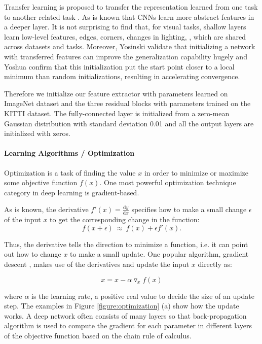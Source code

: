 Transfer learning is proposed to transfer the representation learned from one task to another related task \cite{Pan:2010:STL:1850483.1850545}. As is known that CNNs learn more abstract features in a deeper layer. It is not surprising to find that, for visual tasks, shallow layers learn low-level features, \eg edges, corners, changes in lighting, \etc, which are shared across datasets and tasks. Moreover, Yosinski \etal validate \cite{DBLP:journals/corr/YosinskiCBL14} that initializing a network with transferred features can improve the generalization capability hugely and Yoshua \etal \cite{NIPS2006_3048} confirm that this initialization put the start point closer to a local minimum than random initializations, resulting in accelerating convergence.

Therefore we initialize our feature extractor with parameters learned on ImageNet dataset \cite{DBLP:Russakovsky14} and the three residual blocks with parameters trained on the KITTI dataset. The fully-connected layer is initialized from a zero-mean Gaussian distribution with standard deviation 0.01 and all the output layers are initialized with zeros.


\paragraph{Learning Algorithms / Optimization}

Optimization is a task of finding the value $x$ in order to minimize or maximize some objective function $f(x)$. One most powerful optimization technique category in deep learning is gradient-based.

As is known, the derivative $f'(x)=\frac{\text{d}y}{\text{d}x}$ specifies how to make a small change $\epsilon$ of the input $x$ to get the corresponding change in the function:
\begin{equation}
	f(x + \epsilon)~ \approx ~ f(x) + \epsilon f'(x).
\end{equation}

Thus, the derivative tells the direction to minimize a function, i.e. it can point out how to change $x$ to make a small update. One popular algorithm, gradient descent \cite{gd1847}, makes use of the derivatives and update the input $x$ directly as:

\begin{equation}
x = x - \alpha {\triangledown} _x f(x)
\end{equation}

where $\alpha$ is the learning rate, a positive real value to decide the size of an update step. The examples in Figure \ref{figure:optimization} (a) show how the update works.  A deep network often consists of many layers so that back-propagation algorithm \cite{Rumelhart:1988:LRB:65669.104451} is used to compute the gradient for each parameter in different layers of the objective function based on the chain rule of calculus.

